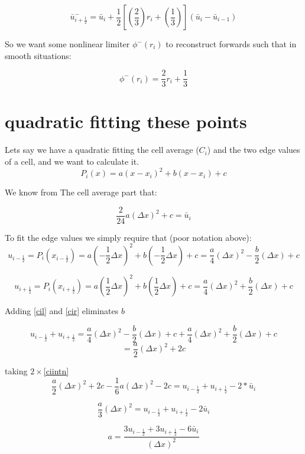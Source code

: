 \documentclass[12pt]{article}
\begin{document}
\[\bar{u}^-_{i + \frac{1}{2}} = \bar{u}_i + \frac{1}{2} \left[\left(\frac{2}{3}\right)r_i + \left(\frac{1}{3} \right) \right] \left(\bar{u}_{i} - \bar{u}_{i-1}\right) \]

So we want some nonlinear limiter $\phi^-(r_i)$ to reconstruct forwards such that in smooth situations:

\[\phi^-(r_i) = \frac{2}{3}r_i + \frac{1}{3} \]


\section{quadratic fitting these points}
Lets say we have a quadratic fitting the cell average ($C_i$) and the two edge values of a cell, and we want to calculate it.
\[P_i(x) = a(x-x_i)^2 + b(x-x_i) +c \]

We know from The cell average part that:

\begin{dmath}
\label{ciintn}
\frac{2}{24}a(\Delta x)^2 + c =\bar{u}_i 
\end{dmath}

To fit the edge values we simply require that (poor notation above):
\begin{dmath}
\label{cil}
u_{i - \frac{1}{2}} =P_i(x_{i - \frac{1}{2}}) = a(-\frac{1}{2}\Delta x)^2 + b(-\frac{1}{2}\Delta x) +c = \frac{a}{4}(\Delta x)^2 -\frac{b}{2}(\Delta x) +c
\end{dmath}

\begin{dmath}
\label{cir}
u_{i + \frac{1}{2}} =P_i(x_{i + \frac{1}{2}}) = a(\frac{1}{2}\Delta x)^2 + b(\frac{1}{2}\Delta x) +c = \frac{a}{4}(\Delta x)^2 +\frac{b}{2}(\Delta x) +c
\end{dmath}

Adding \eqref{cil} and \eqref{cir} eliminates $b$

\[u_{i - \frac{1}{2}} +u_{i + \frac{1}{2}} =  \frac{a}{4}(\Delta x)^2 -\frac{b}{2}(\Delta x) +c + \frac{a}{4}(\Delta x)^2 +\frac{b}{2}(\Delta x) +c  \]
\[ =\frac{a}{2}(\Delta x)^2 + 2c \]

taking $2 \times$\eqref{ciintn}
\[\frac{a}{2}(\Delta x)^2 + 2c - \frac{1}{6}a(\Delta x)^2 - 2c = u_{i - \frac{1}{2}} +u_{i + \frac{1}{2}} -2*\bar{u}_i \]

\[\frac{a}{3}(\Delta x)^2 = u_{i - \frac{1}{2}} +u_{i + \frac{1}{2}} -2\bar{u}_i \]

\[a = \frac{3u_{i - \frac{1}{2}} +3u_{i + \frac{1}{2}} -6\bar{u}_i}{(\Delta x)^2} \]
\end{document}
